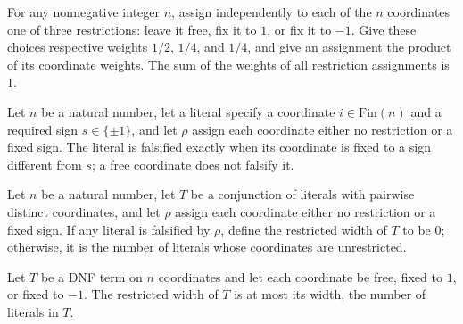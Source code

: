 \begin{theorem}
\label{FABL.sum_restrictionAssignmentWeight}
\leanok
{}
For any nonnegative integer $n$, assign independently to each of the $n$ coordinates one
of three restrictions: leave it free, fix it to $1$, or fix it to $-1$. Give these
choices respective weights $1/2$, $1/4$, and $1/4$, and give an assignment the product
of its coordinate weights. The sum of the weights of all restriction assignments is $1$.
\end{theorem}

\begin{definition}
\label{FABL.Literal.isFalsified}
\leanok
{}
Let $n$ be a natural number, let a literal specify a coordinate $i\in\mathrm{Fin}(n)$
and a required sign $s\in\{\pm1\}$, and let $\rho$ assign each coordinate either no
restriction or a fixed sign. The literal is falsified exactly when its coordinate is
fixed to a sign different from $s$; a free coordinate does not falsify it.
\end{definition}

\begin{definition}
\label{FABL.DNFTerm.restrictedWidthOf}
\leanok
{}
Let $n$ be a natural number, let $T$ be a conjunction of literals with pairwise distinct
coordinates, and let $\rho$ assign each coordinate either no restriction or a fixed
sign. If any literal is falsified by $\rho$, define the restricted width of $T$ to be
$0$; otherwise, it is the number of literals whose coordinates are unrestricted.
\end{definition}

\begin{theorem}
\label{FABL.DNFTerm.restrictedWidthOf_le_width}
\leanok
{}
Let $T$ be a DNF term on $n$ coordinates and let each coordinate be free, fixed to $1$,
or fixed to $-1$. The restricted width of $T$ is at most its width, the number of
literals in $T$.
\end{theorem}

